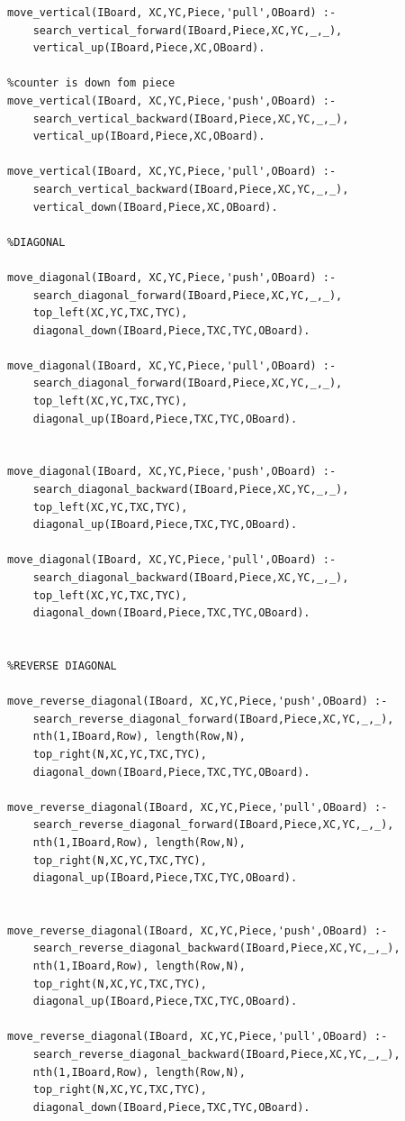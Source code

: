 \documentclass[15pt,a4paper]{article}
\begin{document}
\begin{verbatim}
move_vertical(IBoard, XC,YC,Piece,'pull',OBoard) :- 
	search_vertical_forward(IBoard,Piece,XC,YC,_,_),
	vertical_up(IBoard,Piece,XC,OBoard).	
	
%counter is down fom piece
move_vertical(IBoard, XC,YC,Piece,'push',OBoard) :- 
	search_vertical_backward(IBoard,Piece,XC,YC,_,_),
	vertical_up(IBoard,Piece,XC,OBoard).	
	
move_vertical(IBoard, XC,YC,Piece,'pull',OBoard) :- 
	search_vertical_backward(IBoard,Piece,XC,YC,_,_),
	vertical_down(IBoard,Piece,XC,OBoard).

%DIAGONAL
	
move_diagonal(IBoard, XC,YC,Piece,'push',OBoard) :- 
	search_diagonal_forward(IBoard,Piece,XC,YC,_,_),
	top_left(XC,YC,TXC,TYC),
	diagonal_down(IBoard,Piece,TXC,TYC,OBoard).
	
move_diagonal(IBoard, XC,YC,Piece,'pull',OBoard) :- 
	search_diagonal_forward(IBoard,Piece,XC,YC,_,_),
	top_left(XC,YC,TXC,TYC),
	diagonal_up(IBoard,Piece,TXC,TYC,OBoard).
	
		
move_diagonal(IBoard, XC,YC,Piece,'push',OBoard) :- 
	search_diagonal_backward(IBoard,Piece,XC,YC,_,_),
	top_left(XC,YC,TXC,TYC),
	diagonal_up(IBoard,Piece,TXC,TYC,OBoard).
	
move_diagonal(IBoard, XC,YC,Piece,'pull',OBoard) :- 
	search_diagonal_backward(IBoard,Piece,XC,YC,_,_),
	top_left(XC,YC,TXC,TYC),
	diagonal_down(IBoard,Piece,TXC,TYC,OBoard).


%REVERSE DIAGONAL
	
move_reverse_diagonal(IBoard, XC,YC,Piece,'push',OBoard) :- 
	search_reverse_diagonal_forward(IBoard,Piece,XC,YC,_,_),
	nth(1,IBoard,Row), length(Row,N),
	top_right(N,XC,YC,TXC,TYC),
	diagonal_down(IBoard,Piece,TXC,TYC,OBoard).
	
move_reverse_diagonal(IBoard, XC,YC,Piece,'pull',OBoard) :- 
	search_reverse_diagonal_forward(IBoard,Piece,XC,YC,_,_),
	nth(1,IBoard,Row), length(Row,N),
	top_right(N,XC,YC,TXC,TYC),
	diagonal_up(IBoard,Piece,TXC,TYC,OBoard).
	
		
move_reverse_diagonal(IBoard, XC,YC,Piece,'push',OBoard) :- 
	search_reverse_diagonal_backward(IBoard,Piece,XC,YC,_,_),
	nth(1,IBoard,Row), length(Row,N),
	top_right(N,XC,YC,TXC,TYC),
	diagonal_up(IBoard,Piece,TXC,TYC,OBoard).
	
move_reverse_diagonal(IBoard, XC,YC,Piece,'pull',OBoard) :- 
	search_reverse_diagonal_backward(IBoard,Piece,XC,YC,_,_),
	nth(1,IBoard,Row), length(Row,N),
	top_right(N,XC,YC,TXC,TYC),
	diagonal_down(IBoard,Piece,TXC,TYC,OBoard).






\end{verbatim}
\end{document}
